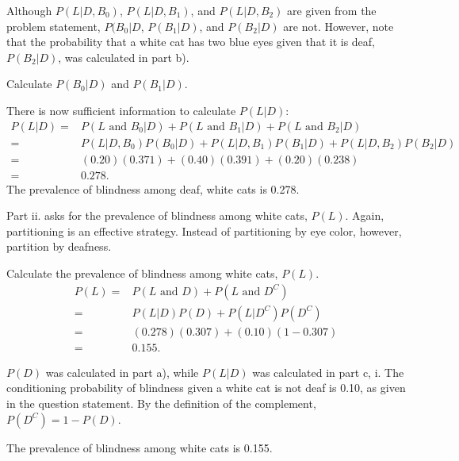 Although $P(L|D, B_0)$, $P(L|D, B_1)$, and $P(L|D, B_2)$ are given from the problem statement, $P(B_0|D$, $P(B_1|D)$, and $P(B_2|D)$ are not. However, note that the probability that a white cat has two blue eyes given that it is deaf, $P(B_2|D)$, was calculated in part b). 

\begin{exercisewrap}
\begin{nexercise}
Calculate $P(B_0|D)$ and $P(B_1|D)$.\footnotemark{}
\end{nexercise}
\end{exercisewrap}
\footnotetext{\[P(B_0|D) = \dfrac{P(D \textrm{ and } B_0)}{P(D)} = \dfrac{P(D|B_0)P(B_0)}{P(D)} = \dfrac{(0.19)(0.60)}{0.307} = 0.371. \] \[P(B_1|D) = \dfrac{P(D \textrm{ and } B_1)}{P(D)} = \dfrac{P(D|B_1)P(B_1)}{P(D)} = \dfrac{(0.40)(0.30)}{0.307} = 0.391. \]}

There is now sufficient information to calculate $P(L|D)$: 
\begin{align*}
P(L|D) =& P(L \textrm{ and } B_0|D) + P(L \textrm{ and } B_1 | D) + P(L \textrm{ and } B_2 |D) \\
=& P(L|D, B_0)P(B_0|D) + P(L|D, B_1)P(B_1|D) + P(L|D, B_2)P(B_2|D) \\
=& (0.20)(0.371) + (0.40)(0.391) + (0.20)(0.238) \\
=& 0.278.
\end{align*}
The prevalence of blindness among deaf, white cats is 0.278.

Part ii. asks for the prevalence of blindness among white cats, $P(L)$. Again, partitioning is an effective strategy. Instead of partitioning by eye color, however, partition by deafness.

\textD{\newpage}

\begin{examplewrap}
\begin{nexample}{Calculate the prevalence of blindness among white cats, $P(L)$.}
\begin{align*}
P(L) =& P(L \textrm{ and } D) + P(L \textrm{ and } D^C) \\
=& P(L|D)P(D) + P(L|D^C)P(D^C) \\
=& (0.278)(0.307) + (0.10)(1 - 0.307) \\
=& 0.155.
\end{align*}	
	
$P(D)$ was calculated in part a), while $P(L|D)$ was calculated in part c, i. The conditioning probability of blindness given a white cat is not deaf is 0.10, as given in the question statement. By the definition of the complement, $P(D^C) = 1 - P(D)$. 

The prevalence of blindness among white cats is 0.155.
\end{nexample}
\end{examplewrap}

